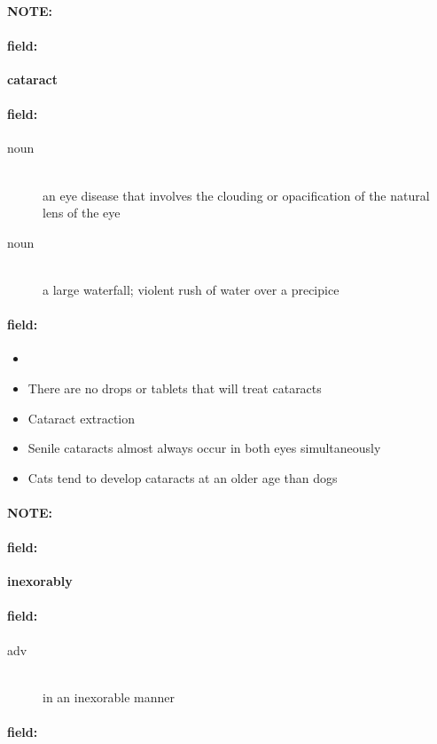 \documentclass[12pt]{article}
\newenvironment{note}{\paragraph{NOTE:}}{}
\newenvironment{field}{\paragraph{field:}}{}
\begin{document}
\begin{note}
\begin{field}
\textbf{\large cataract}
\end{field}


\begin{field}
\begin{description}
\item[noun] \hfill \\ 
an eye disease that involves the clouding or opacification of the natural lens of the eye

\item[noun] \hfill \\ 
a large waterfall; violent rush of water over a precipice

\end{description}
\end{field}

\begin{field}
\begin{itemize}
\item 
\item There are no drops or tablets that will treat cataracts
\item Cataract extraction
\item Senile cataracts almost always occur in both eyes simultaneously
\item Cats tend to develop cataracts at an older age than dogs
\end{itemize}
\end{field}
\end{note}
\begin{note}
\begin{field}
\textbf{\large inexorably}
\end{field}


\begin{field}
\begin{description}
\item[adv] \hfill \\ 
in an inexorable manner

\end{description}
\end{field}

\begin{field}
\end{field}
\end{note}
\end{document}
